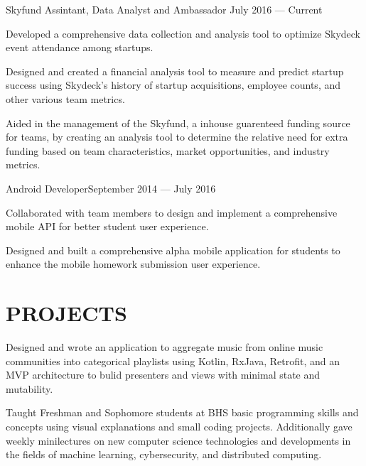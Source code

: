 \documentclass[10pt]{article}
\begin{document}
	   		
	   			{Skyfund Assintant, Data Analyst and Ambassador}
                {July 2016 --- Current}
			  		\begin{accomplishments}
	                   		\item Developed a comprehensive data collection and analysis tool to optimize Skydeck event attendance among startups.
	                   		\item Designed and created a financial analysis tool to measure and predict startup success using Skydeck's history of startup acquisitions, employee counts, and other various team metrics.
                            \item Aided in the management of the Skyfund, a in{\textendash}house guarenteed funding source for teams, by creating an analysis tool to determine the relative need for extra funding based on team characteristics, market opportunities, and industry metrics.
	                  \end{accomplishments}
                  	 
                  	 
                {Android Developer}{September 2014 --- July 2016}
                 			\begin{accomplishments}					        
                   			\item Collaborated with team members to design and implement a comprehensive mobile API for better student user experience.
                   			\item Designed and built a comprehensive alpha mobile application for students to enhance the mobile homework submission user experience.
                  		 \end{accomplishments}
                  		 
                  
\section*{PROJECTS}
                 {Designed and wrote an application to aggregate music from online music communities into categorical playlists using Kotlin, RxJava, Retrofit, and an MVP architecture to bulid presenters and views with minimal state and mutability.}
                
                {Taught Freshman and Sophomore students at BHS basic programming skills and concepts using visual explanations and small coding projects. Additionally gave weekly mini{\textendash}lectures on new computer science technologies and developments in the fields of machine learning, cybersecurity, and distributed computing.}
\end{document}
